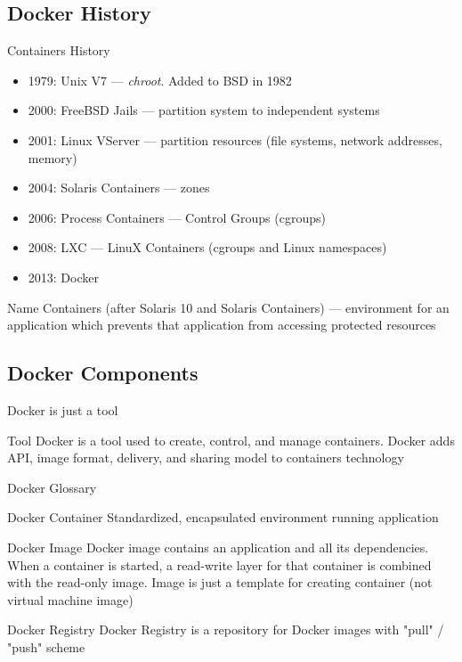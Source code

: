 \subsection{Docker History}

\begin{frame}{Containers History}  
  \begin{itemize}
    \item 1979: Unix V7 --- {\it chroot}. Added to BSD in 1982
    \item 2000: FreeBSD Jails --- partition system to independent systems
    \item 2001: Linux VServer --- partition resources (file systems, network addresses, memory)
    \item 2004: Solaris Containers --- zones
    \item 2006: Process Containers --- Control Groups (cgroups)
    \item 2008: LXC --- LinuX Containers (cgroups and Linux namespaces)
    \item 2013: Docker
  \end{itemize}  
  \begin{exampleblock}{Name}
  Containers (after Solaris 10 and Solaris Containers) --- environment for an application which prevents that application from accessing protected resources
  \end{exampleblock}  
\end{frame}

\subsection{Docker Components}

\begin{frame}{Docker is just a tool}  
  \begin{block}{Tool}
  Docker is a tool used to create, control, and manage containers. Docker adds API, image format, delivery, and sharing model to containers technology
  \end{block}
\end{frame}

\begin{frame}{Docker Glossary}
  \begin{block}{Docker Container}
  Standardized, encapsulated environment running application
  \end{block}  
  \begin{block}{Docker Image}
  Docker image contains an application and all its dependencies. When a container is started, a read-write layer for that container is combined with the read-only image. Image is just a template for creating container (not virtual machine image)
  \end{block}  
  \begin{block}{Docker Registry}
  Docker Registry is a repository for Docker images with "pull" / "push" scheme    
  \end{block}  
\end{frame}

